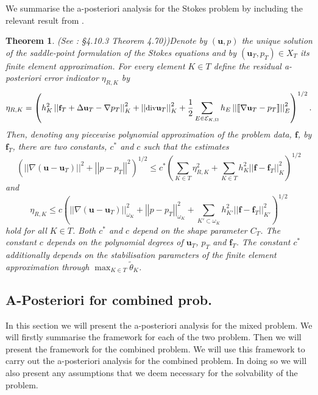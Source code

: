 \documentclass[12pt,a4paper]{article}
\newtheorem{theorem}{Theorem}[section]
\theoremstyle{definition}
\begin{document}
We summarise the a-posteriori analysis for the Stokes problem by including the relevant result from \cite{verfurth2013posteriori}.
\begin{theorem}{(See \cite{verfurth2013posteriori}: \S4.10.3 Theorem 4.70))}\label{verf_theorem_apost_err_ind}
Denote by $\left(\textbf{u},p\right)$ the unique solution of the saddle-point formulation of the Stokes equations and by $\left(\textbf{u}_T,p_T\right)\in X_T$ its finite element approximation.  For every element $K\in T$ define the residual a-posteriori error indicator $\eta_{R,K}$ by
\begin{equation}\small
\eta_{R,K}=\left(h^2_K\left|\left|\textbf{f}_T+\Delta \textbf{u}_T-\nabla p_T\right|\right|^2_K+\left|\left|\text{div} \textbf{u}_T\right|\right|^2_K+\frac{1}{2}\sum_{E\in\mathcal{E}_{K,\Omega}}h_E\left|\left| \llbracket \nabla \textbf{u}_T -p_T \rrbracket \right|\right|_E^2\right)^{1/2}.\nonumber
\end{equation}
Then, denoting any piecewise polynomial approximation of the problem data, $\textbf{f}$, by $\textbf{f}_T$, there are two constants, $c^*$ and $c$ such that the estimates
\begin{equation}\nonumber
\left(\left|\left|\nabla\left(\textbf{u}-\textbf{u}_T\right)\right|\right|^2+\left|\left|p-p_T\right|\right|^2\right)^{1/2}\leq c^*\left(\sum_{K\in T}\eta^2_{R,K}+\sum_{K\in T}h^2_K\left|\left|\textbf{f}-\textbf{f}_T\right|\right|^2_K\right)^{1/2}
\end{equation}
and
\begin{equation}\nonumber
\eta_{R,K}\leq c \left(\left|\left|\nabla\left(\textbf{u}-\textbf{u}_T\right)\right|\right|_{\omega_K}^2+\left|\left|p-p_T\right|\right|_{\omega_K}^2+\sum_{K'\subset \omega_K}h^2_{K'}\left|\left|\textbf{f}-\textbf{f}_T\right|\right|^2_{K'}\right)^{1/2}
\end{equation}
hold for all $K\in T$.  Both $c^*$ and $c$ depend on the shape parameter $C_T$.  The constant $c$ depends on the polynomial degrees of $\textbf{u}_T$, $p_T$ and $\textbf{f}_T$.  The constant $c^*$ additionally depends on the stabilisation parameters of the finite element approximation through $\max_{K\in T}\widetilde{\theta}_K$.
\end{theorem}


\subsection{A-Posteriori for combined prob.}
In this section we will present the a-posteriori analysis for the mixed problem.  We will firstly summarise the framework for each of the two problem.  Then we will present the framework for the combined problem.   We will use this framework to carry out the a-posteriori analysis for the combined problem.  In doing so we will also present any assumptions that we deem necessary for the solvability of the problem.
\end{document}
